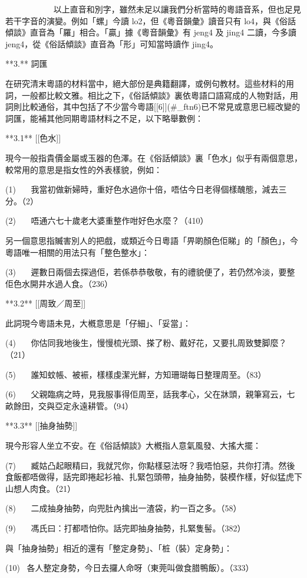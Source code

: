             以上直音和別字，雖然未足以讓我們分析當時的粵語音系，但也足見若干字音的演變。例如「螺」今讀 lo2，但《粵音韻彙》讀音只有 lo4，與《俗話傾談》直音為「羅」相合。「贏」據《粵音韻彙》有 jeng4 及 jing4 二讀，今多讀 jeng4，從《俗話傾談》直音為「形」可知當時讀作 jing4。

**3.** 詞匯

在研究清末粵語的材料當中，絕大部份是典籍翻譯，或例句教材。這些材料的用詞，一般都比較文雅。相比之下，《俗話傾談》裏依粵語口語寫成的人物對話，用詞則比較通俗，其中包括了不少當今粵語[[6]](#_ftn6)已不常見或意思已經改變的詞匯，能補其他同期粵語材料之不足，以下略舉數例：

**3.1** [[色水]]

現今一般指貴價金屬或玉器的色澤。在《俗話傾談》裏「色水」似乎有兩個意思，較常用的意思是指女性的外表樣貌，例如：

(1)    我當初做新婦時，重好色水過你十倍，唔估今日老得個樣醜態，減去三分。（2）

(2)    唔通六七十歲老大婆重整作咁好色水麼？（410）

另一個意思指贓害別人的把戲，或類近今日粵語「畀啲顏色佢睇」的「顏色」，今粵語唯一相關的用法只有「整色整水」：

(3)    遲數日兩個去探過佢，若係恭恭敬敬，有的禮貌便了，若仍然冷淡，要整佢色水開井水過人食。（236）

**3.2** [[周致／周至]]

此詞現今粵語未見，大槪意思是「仔細」、「妥當」：

(4)    你估同我地後生，慢慢梳光頭、搽了粉、戴好花，又要扎周致雙脚麼？（21）

(5)    誰知蚊帳、被裖，樣樣虔潔光鮮，方知珊瑚每日整理周至。（83）

(6)    父親臨病之時，見我服事得佢周至，話我孝心，父在牀頭，親筆寫云，七畝餘田，交與亞定永遠耕管。（94）

**3.3** [[抽身抽勢]]

現今形容人坐立不安。在《俗話傾談》大槪指人意氣風發、大搖大擺：

(7)    臧姑凸起眼精曰，我就咒你，你點樣惡法呀？我唔怕惡，共你打清。然後食飯都唔做得，話完即捲起衫袖、扎緊包頭帶，抽身抽勢，裝模作樣，好似猛虎下山想人肉食。（21）

(8)    二成抽身抽勢，向兜肚內擒出一渣袋，約一百之多。（58）

(9)    馮氏曰：打都唔怕你。話完即抽身抽勢，扎緊隻髻。（382）

與「抽身抽勢」相近的還有「整定身勢」、「桩（裝）定身勢」：

(10)  各人整定身勢，今日去攞人命呀（東莞叫做食腊鴨飯）。（333）

